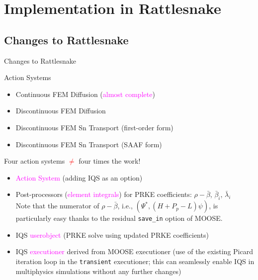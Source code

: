 \documentclass[8pt]{beamer}
\newcommand{\bi}{\begin{itemize}}
\newcommand{\ei}{\end{itemize}}
\newcommand{\tcr}[1]{\textcolor{red}{#1}}
\newcommand{\tcm}[1]{\textcolor{magenta}{#1}}
\begin{document}
\section{Implementation in Rattlesnake}

\subsection{Changes to Rattlesnake}

\begin{frame}{Changes to Rattlesnake}

\begin{block}{Action Systems}
\bi
\item Continuous FEM Diffusion (\tcm{almost complete})
\item Discontinuous FEM Diffusion 
\item Discontinuous FEM Sn Transport (first-order form) 
\item Discontinuous FEM Sn Transport (SAAF form)
\ei
Four action systems \tcr{$\ne$} four times the work!
\end{block}

\begin{block}{}
\bi
\item \tcm{Action System} (adding IQS as an option)
\item Post-processors (\tcm{element integrals}) for PRKE coefficients: $\rho-\bar{\beta}$, $\bar{\beta}_i$, $\bar{\lambda}_i$\\
Note that the numerator of $\rho-\bar{\beta}$, i.e., $\left( \Psi^{*}, (H+P_p-L) \psi \right)$, is particularly easy thanks to the residual {\tt save\_in} option of MOOSE.
\item IQS \tcm{userobject} (PRKE solve using updated PRKE coefficients)
\item IQS \tcm{executioner} derived from MOOSE executioner (use of the existing Picard iteration loop in the {\tt transient} executioner; this can seamlessly enable IQS in multiphysics simulations without any further changes)
\ei
\end{block}

\end{frame}
\end{document}
